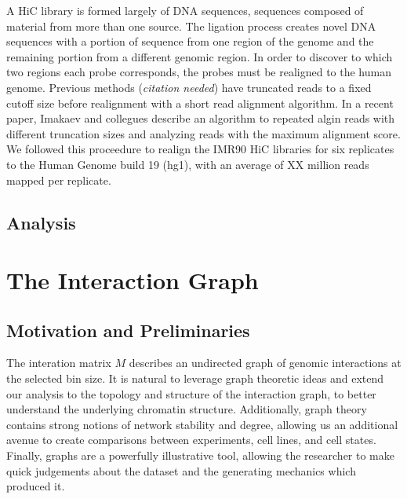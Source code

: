 \documentclass[phd,tocprelim]{cornell}
\begin{document}
A HiC library is formed largely of  DNA sequences,
sequences composed of material from more than one source.  The ligation process
creates novel DNA sequences with a portion of sequence from one region of
the genome and the remaining portion from a different genomic region.  In
order to discover to which two regions each probe corresponds, the probes
must be realigned to the human genome.  Previous methods (\textit{citation needed})
have truncated reads to a fixed cutoff size before realignment with a short
read alignment algorithm.  In a recent paper, Imakaev and collegues
describe an algorithm to repeated algin reads with different truncation sizes
and analyzing reads with the maximum alignment score\cite{Imakaev2012}.  We followed
this proceedure to realign the IMR90 HiC libraries for six replicates to
the Human Genome build 19 (hg1), with an average of XX million reads
mapped per replicate.


\section{Analysis}




\chapter{The Interaction Graph}

\section{Motivation and Preliminaries}

The interation matrix $M$ describes an undirected graph of genomic interactions
at the selected bin size.  It is natural to leverage graph theoretic ideas
and extend our analysis to the topology and structure of the interaction graph,
to better understand the underlying chromatin structure.  Additionally, graph
theory contains strong notions of network stability and degree, allowing us an
additional avenue to create comparisons between experiments, cell lines, and cell
states.  Finally, graphs are a powerfully illustrative tool, allowing the
researcher to make quick judgements about the dataset and the generating
mechanics which produced it.
\end{document}
